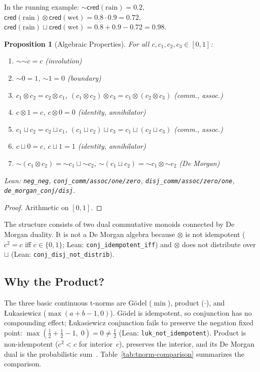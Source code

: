 \documentclass[11pt,a4paper]{article}
\newtheorem{proposition}[theorem]{Proposition}
\newcommand{\cred}{\mathsf{cred}}
\newcommand{\negc}{\mathord{\sim}}
\newcommand{\conjc}{\otimes}
\newcommand{\disjc}{\sqcup}
\begin{document}
In the running example:
$\negc \cred(\text{rain}) = 0.2$,
$\cred(\text{rain}) \conjc \cred(\text{wet})
= 0.8 \cdot 0.9 = 0.72$,
$\cred(\text{rain}) \disjc \cred(\text{wet})
= 0.8 + 0.9 - 0.72 = 0.98$.

\begin{proposition}[Algebraic Properties]
\label{prop:algebraic}
For all $c, c_1, c_2, c_3 \in [0,1]$:
\begin{enumerate}[label=(\alph*),nosep]
\item $\negc\negc c = c$ \hfill (involution)
\item $\negc 0 = 1$, $\negc 1 = 0$ \hfill (boundary)
\item $c_1 \conjc c_2 = c_2 \conjc c_1$,
  $(c_1 \conjc c_2) \conjc c_3 = c_1 \conjc (c_2 \conjc c_3)$
  \hfill (comm., assoc.)
\item $c \conjc 1 = c$, $c \conjc 0 = 0$ \hfill (identity,
  annihilator)
\item $c_1 \disjc c_2 = c_2 \disjc c_1$,
  $(c_1 \disjc c_2) \disjc c_3 = c_1 \disjc (c_2 \disjc c_3)$
  \hfill (comm., assoc.)
\item $c \disjc 0 = c$, $c \disjc 1 = 1$ \hfill (identity,
  annihilator)
\item $\negc(c_1 \conjc c_2) = \negc c_1 \disjc \negc c_2$,
  $\negc(c_1 \disjc c_2) = \negc c_1 \conjc \negc c_2$
  \hfill (De Morgan)
\end{enumerate}
Lean: \texttt{neg\_neg}, \texttt{conj\_comm/\allowbreak assoc/\allowbreak one/\allowbreak zero},
\texttt{disj\_comm/\allowbreak assoc/\allowbreak zero/\allowbreak one},
\texttt{de\_morgan\_conj/\allowbreak disj}.
\end{proposition}

\begin{proof}
Arithmetic on $[0,1]$.
\end{proof}

The structure consists of two dual commutative monoids connected by
De Morgan duality.
It is not a De Morgan algebra because $\conjc$ is not idempotent
($c^2 = c$ iff $c \in \{0,1\}$;
Lean: \texttt{conj\_idempotent\_iff})
and $\conjc$ does not distribute over $\disjc$
(Lean: \texttt{conj\_disj\_not\_distrib}).

\subsection{Why the Product?}

The three basic continuous t-norms are G\"odel ($\min$),
product ($\cdot$), and \L ukasiewicz
($\max(a{+}b{-}1,\allowbreak 0)$).
G\"odel is idempotent, so conjunction has no compounding
effect; \L ukasiewicz conjunction fails to preserve the negation fixed point:
$\max(\tfrac{1}{2} + \tfrac{1}{2} - 1,\; 0) = 0 \neq \tfrac{1}{2}$
(Lean: \texttt{luk\_not\_idempotent}).
Product is non-idempotent ($c^2 < c$ for interior~$c$),
preserves the interior, and its De Morgan dual is the
probabilistic sum~\cite{klement2000}.
Table~\ref{tab:tnorm-comparison} summarizes the comparison.
\end{document}
